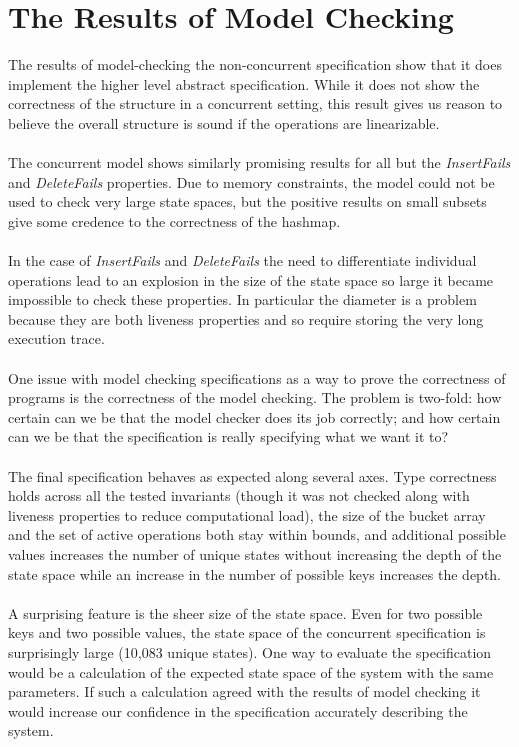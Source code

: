 \documentclass{uit-thesis}
\begin{document}
\section{The Results of Model Checking}
The results of model-checking the non-concurrent specification show that it does implement the higher level abstract specification. While it does not show the correctness of the structure in a concurrent setting, this result gives us reason to believe the overall structure is sound if the operations are linearizable.
\\\\
The concurrent model shows similarly promising results for all but the \textit{InsertFails} and \textit{DeleteFails} properties. Due to memory constraints, the model could not be used to check very large state spaces, but the positive results on small subsets give some credence to the correctness of the hashmap.
\\\\
In the case of \textit{InsertFails} and \textit{DeleteFails} the need to differentiate individual operations lead to an explosion in the size of the state space so large it became impossible to check these properties. In particular the diameter is a problem because they are both liveness properties and so require storing the very long execution trace.
\\\\
One issue with model checking specifications as a way to prove the correctness of programs is the correctness of the model checking. The problem is two-fold: how certain can we be that the model checker does its job correctly; and how certain can we be that the specification is really specifying what we want it to?
\\\\
The final specification behaves as expected along several axes. Type correctness holds across all the tested invariants (though it was not checked along with liveness properties to reduce computational load), the size of the bucket array and the set of active operations both stay within bounds, and additional possible values increases the number of unique states without increasing the depth of the state space while an increase in the number of possible keys increases the depth.
\\\\
A surprising feature is the sheer size of the state space. Even for two possible keys and two possible values, the state space of the concurrent specification is surprisingly large (10,083 unique states). One way to evaluate the specification would be a calculation of the expected state space of the system with the same parameters. If such a calculation agreed with the results of model checking it would increase our confidence in the specification accurately describing the system.
\end{document}
